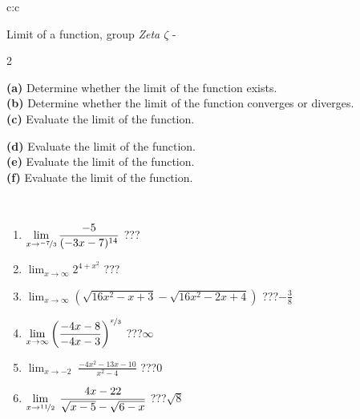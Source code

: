 \documentclass[10pt]{report}
\begin{document}
\newpage
\thispagestyle{empty}
\begin{tabular}{c:c}
\begin{minipage}[c][104.5mm][t]{0.5\linewidth}
\begin{center}
\vspace{5mm}
{\huge Limit of a function, group \textit{Zeta $\zeta$} -}\\[5mm]
\begin{minipage}{0.95\linewidth}
\begin{center}
{\small \begin{multicols}{2} \raggedright
\textbf{(a)} Determine whether the limit of the function exists. \\[1mm]
\textbf{(b)} Determine whether the limit of the function converges or diverges. \\[1mm]
\textbf{(c)} Evaluate the limit of the function. \par \columnbreak
\textbf{(d)} Evaluate the limit of the function. \\[1mm]
\textbf{(e)} Evaluate the limit of the function. \\[1mm]
\textbf{(f)} Evaluate the limit of the function. \\[1mm]
\end{multicols}
}
\end{center}
\end{minipage}
\\[1mm]
\begin{minipage}{0.79\linewidth}
\begin{center}
\begin{varwidth}{\linewidth}
\setlength{\itemsep}{0pt}
\begin{enumerate}
\normalsize
\item $\displaystyle\lim_{x\to\nicefrac{-7}{3}}{\frac{-5}{(-3x-7)^{14}}}$\quad \dotfill\; ???\;\dotfill \quad {}
\item $\displaystyle\lim_{x\to\infty}{2^{4+x^2}}$\quad \dotfill\; ???\;\dotfill \quad {}
\item $\displaystyle\lim_{x\to\infty}{\left(\sqrt{16x^2-x+3} - \sqrt{16x^2-2x+4}\right)}$\quad \dotfill\; ???\;\dotfill \quad $-\frac{3}{8}$
\item $\displaystyle\lim_{x\to\infty}{\left( \frac{-4x-8}{-4x-3} \right)^{\nicefrac{x}{3}}}$\quad \dotfill\; ???\;\dotfill \quad $\infty$
\item $\displaystyle\lim_{x\to -2}{\;\frac{-4x^2-13x-10}{x^2-4}}$\quad \dotfill\; ???\;\dotfill \quad $0$
\item $\displaystyle\lim_{x\to \nicefrac{11}{2}}{\;\frac{4x-22}{\sqrt{x-5} - \sqrt{6-x}}}$\quad \dotfill\; ???\;\dotfill \quad $\sqrt{8}$

\end{enumerate}
\end{varwidth}
\end{center}
\end{minipage}
\end{center}
\end{minipage}
\end{tabular}
\end{document}
